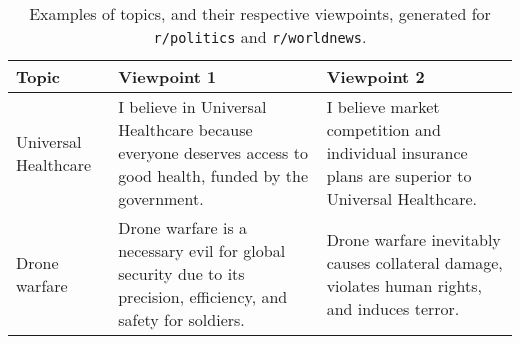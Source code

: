 \begin{table}[]
    \centering
    \footnotesize
    \caption{Examples of topics, and their respective viewpoints, generated for \texttt{r/politics} and \texttt{r/worldnews}.}
    \begin{tabular}{
    >{\raggedright\arraybackslas}p{1.4cm}
    >{\raggedright\arraybackslas}p{2.6cm}
    >{\raggedright\arraybackslash}p{2.6cm}
    }
    \toprule
    \textbf{Topic} &  \textbf{Viewpoint 1} &  \textbf{Viewpoint 2}\\
    \midrule
    Universal Healthcare & I believe in Universal Healthcare because everyone deserves access to good health, funded by the government. & I believe market competition and individual insurance plans are superior to Universal Healthcare.\\
   \addlinespace
    Drone warfare & 
    Drone warfare is a necessary evil for global security due to its precision, efficiency, and safety for soldiers.
    & 
    Drone warfare inevitably causes collateral damage, violates human rights, and induces terror.\\
    \bottomrule
    \end{tabular}
    \label{tab:shortened_list}
\end{table}
